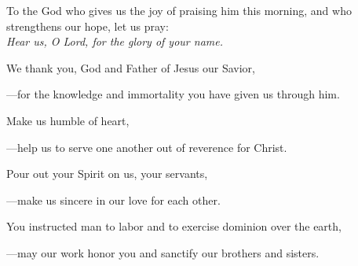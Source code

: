 \intercessions\indent

\begin{hangpar}

To the God who gives us the joy of praising him this morning, and who strengthens our hope, let us pray:\\
\emph{Hear us, O Lord, for the glory of your name.}

\medskip We thank you, God and Father of Jesus our Savior,

{\color{red}---\thinspace}for the knowledge and immortality you have given us through him.

\medskip Make us humble of heart,

{\color{red}---\thinspace}help us to serve one another out of reverence for Christ.

\medskip Pour out your Spirit on us, your servants,

{\color{red}---\thinspace}make us sincere in our love for each other.

\medskip You instructed man to labor and to exercise dominion over the earth,

{\color{red}---\thinspace}may our work honor you and sanctify our brothers and sisters.

\end{hangpar}

